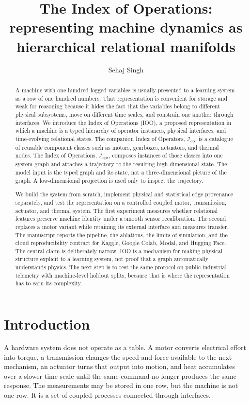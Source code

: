 \documentclass[11pt]{article}
\title{\bf The Index of Operations: representing machine dynamics as hierarchical relational manifolds}
\author{Sehaj Singh}
\date{}
\newcommand{\Iop}{\mathcal{I}_{\mathrm{op}}}
\newcommand{\Iops}{\mathcal{I}_{\mathrm{ops}}}
\begin{document}
\maketitle

\begin{abstract}
A machine with one hundred logged variables is usually presented to a learning system as a row of one hundred numbers. That representation is convenient for storage and weak for reasoning because it hides the fact that the variables belong to different physical subsystems, move on different time scales, and constrain one another through interfaces. We introduce the Index of Operations (IOO), a proposed representation in which a machine is a typed hierarchy of operator instances, physical interfaces, and time-evolving relational states. The companion Index of Operators, $\Iop$, is a catalogue of reusable component classes such as motors, gearboxes, actuators, and thermal nodes. The Index of Operations, $\Iops$, composes instances of those classes into one system graph and attaches a trajectory to the resulting high-dimensional state. The model input is the typed graph and its state, not a three-dimensional picture of the graph. A low-dimensional projection is used only to inspect the trajectory.

We build the system from scratch, implement physical and statistical edge provenance separately, and test the representation on a controlled coupled motor, transmission, actuator, and thermal system. The first experiment measures whether relational features preserve machine identity under a smooth sensor recalibration. The second replaces a motor variant while retaining its external interface and measures transfer. The manuscript reports the pipeline, the ablations, the limits of simulation, and the cloud reproducibility contract for Kaggle, Google Colab, Modal, and Hugging Face. The central claim is deliberately narrow. IOO is a mechanism for making physical structure explicit to a learning system, not proof that a graph automatically understands physics. The next step is to test the same protocol on public industrial telemetry with machine-level holdout splits, because that is where the representation has to earn its complexity.
\end{abstract}

\section{Introduction}

A hardware system does not operate as a table. A motor converts electrical effort into torque, a transmission changes the speed and force available to the next mechanism, an actuator turns that output into motion, and heat accumulates over a slower time scale until the same command no longer produces the same response. The measurements may be stored in one row, but the machine is not one row. It is a set of coupled processes connected through interfaces.
\end{document}
